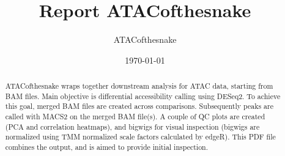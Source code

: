 \documentclass{article}
\title{Report ATACofthesnake}
\author{ATACofthesnake}
\date{\today}
\begin{document}
\maketitle

\begin{abstract}
ATACofthesnake wraps together downstream analysis for ATAC data, starting from BAM files. 
Main objective is differential accessibility calling using DESeq2.
To achieve this goal, merged BAM files are created across comparisons. Subsequently peaks are called with MACS2 on the merged BAM file(s).
A couple of QC plots are created (PCA and correlation heatmaps), and bigwigs for visual inspection (bigwigs are normalized using TMM normalized scale factors calculated by edgeR).
This PDF file combines the output, and is aimed to provide initial inspection.
\end{abstract}

\pagebreak
\end{document}
